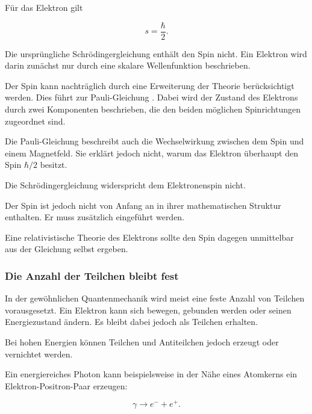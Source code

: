 Für das Elektron gilt

\begin{equation}
	s
	=
	\frac{\hbar}{2}.
	\label{eq:spin_elektron_grenzen}
\end{equation}

Die ursprüngliche Schrödingergleichung enthält den Spin nicht. Ein
Elektron wird darin zunächst nur durch eine skalare Wellenfunktion
beschrieben.

Der Spin kann nachträglich durch eine Erweiterung der Theorie
berücksichtigt werden. Dies führt zur Pauli-Gleichung%
. Dabei wird der Zustand des Elektrons durch zwei
Komponenten beschrieben, die den beiden möglichen Spinrichtungen
zugeordnet sind.

Die Pauli-Gleichung beschreibt auch die Wechselwirkung zwischen dem
Spin und einem Magnetfeld. Sie erklärt jedoch nicht, warum das Elektron
überhaupt den Spin \(\hbar/2\) besitzt.

\begin{DidacticBox}
	\label{box:spin_nicht_hergeleitet_schroedinger}
	
	Die Schrödingergleichung widerspricht dem Elektronenspin nicht.
	
	Der Spin ist jedoch nicht von Anfang an in ihrer mathematischen
	Struktur enthalten. Er muss zusätzlich eingeführt werden.
	
	Eine relativistische Theorie des Elektrons sollte den Spin dagegen
	unmittelbar aus der Gleichung selbst ergeben.
\end{DidacticBox}

\subsubsection*{Die Anzahl der Teilchen bleibt fest}

In der gewöhnlichen Quantenmechanik wird meist eine feste Anzahl von
Teilchen vorausgesetzt. Ein Elektron kann sich bewegen, gebunden werden
oder seinen Energiezustand ändern. Es bleibt dabei jedoch als Teilchen
erhalten.

Bei hohen Energien können Teilchen und Antiteilchen%
 jedoch erzeugt oder vernichtet werden.

Ein energiereiches Photon kann beispielsweise in der Nähe eines
Atomkerns ein Elektron-Positron-Paar erzeugen:

\begin{equation}
	\gamma
	\longrightarrow
	e^-
	+
	e^+.
	\label{eq:paarbildung_elektron_positron_grenzen}
\end{equation}


